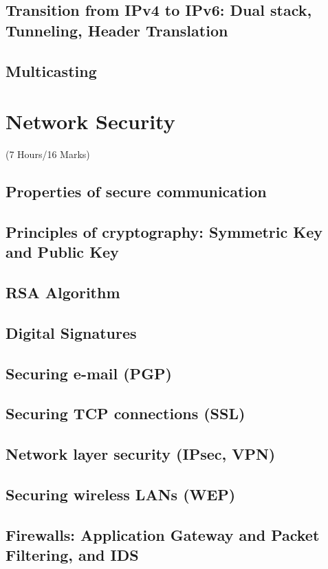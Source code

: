 \documentclass[12pt]{article}
\begin{document}
	\subsection{Transition from IPv4 to IPv6: Dual stack, Tunneling, Header Translation}
	\subsection{Multicasting}

	\pagebreak

\section{Network Security}
	\begin{center}(7 Hours/16 Marks)\end{center}
	\subsection{Properties of secure communication}
	\subsection{Principles of cryptography: Symmetric Key and Public Key}
	\subsection{RSA Algorithm}
	\subsection{Digital Signatures}
	\subsection{Securing e-mail (PGP)}
	\subsection{Securing TCP connections (SSL)}
	\subsection{Network layer security (IPsec, VPN)}
	\subsection{Securing wireless LANs (WEP)}
	\subsection{Firewalls: Application Gateway and Packet Filtering, and IDS}
\end{document}
